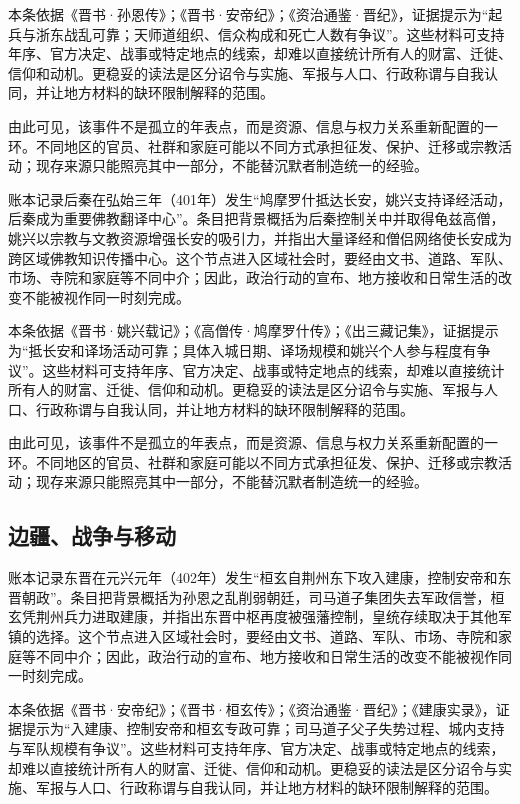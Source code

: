 本条依据《晋书·孙恩传》；《晋书·安帝纪》；《资治通鉴·晋纪》，证据提示为“起兵与浙东战乱可靠；天师道组织、信众构成和死亡人数有争议”。这些材料可支持年序、官方决定、战事或特定地点的线索，却难以直接统计所有人的财富、迁徙、信仰和动机。更稳妥的读法是区分诏令与实施、军报与人口、行政称谓与自我认同，并让地方材料的缺环限制解释的范围。

由此可见，该事件不是孤立的年表点，而是资源、信息与权力关系重新配置的一环。不同地区的官员、社群和家庭可能以不同方式承担征发、保护、迁移或宗教活动；现存来源只能照亮其中一部分，不能替沉默者制造统一的经验。

账本记录后秦在弘始三年（401年）发生“鸠摩罗什抵达长安，姚兴支持译经活动，后秦成为重要佛教翻译中心”。条目把背景概括为后秦控制关中并取得龟兹高僧，姚兴以宗教与文教资源增强长安的吸引力，并指出大量译经和僧侣网络使长安成为跨区域佛教知识传播中心。这个节点进入区域社会时，要经由文书、道路、军队、市场、寺院和家庭等不同中介；因此，政治行动的宣布、地方接收和日常生活的改变不能被视作同一时刻完成。

本条依据《晋书·姚兴载记》；《高僧传·鸠摩罗什传》；《出三藏记集》，证据提示为“抵长安和译场活动可靠；具体入城日期、译场规模和姚兴个人参与程度有争议”。这些材料可支持年序、官方决定、战事或特定地点的线索，却难以直接统计所有人的财富、迁徙、信仰和动机。更稳妥的读法是区分诏令与实施、军报与人口、行政称谓与自我认同，并让地方材料的缺环限制解释的范围。

由此可见，该事件不是孤立的年表点，而是资源、信息与权力关系重新配置的一环。不同地区的官员、社群和家庭可能以不同方式承担征发、保护、迁移或宗教活动；现存来源只能照亮其中一部分，不能替沉默者制造统一的经验。

\subsection{边疆、战争与移动}

账本记录东晋在元兴元年（402年）发生“桓玄自荆州东下攻入建康，控制安帝和东晋朝政”。条目把背景概括为孙恩之乱削弱朝廷，司马道子集团失去军政信誉，桓玄凭荆州兵力进取建康，并指出东晋中枢再度被强藩控制，皇统存续取决于其他军镇的选择。这个节点进入区域社会时，要经由文书、道路、军队、市场、寺院和家庭等不同中介；因此，政治行动的宣布、地方接收和日常生活的改变不能被视作同一时刻完成。

本条依据《晋书·安帝纪》；《晋书·桓玄传》；《资治通鉴·晋纪》；《建康实录》，证据提示为“入建康、控制安帝和桓玄专政可靠；司马道子父子失势过程、城内支持与军队规模有争议”。这些材料可支持年序、官方决定、战事或特定地点的线索，却难以直接统计所有人的财富、迁徙、信仰和动机。更稳妥的读法是区分诏令与实施、军报与人口、行政称谓与自我认同，并让地方材料的缺环限制解释的范围。

